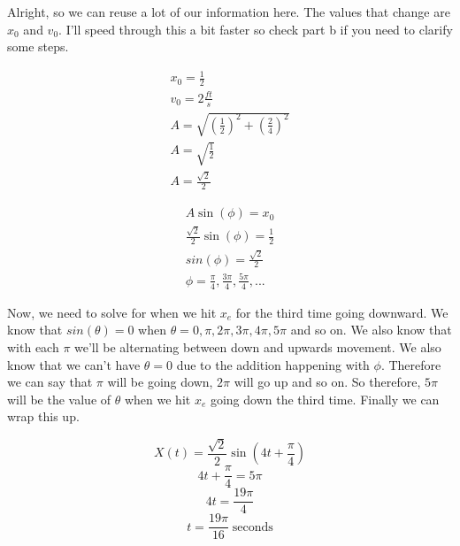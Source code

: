 \documentclass[10pt,letterpaper]{amspset}
\begin{document}
\begin{solution}
    Alright, so we can reuse a lot of our information here. The values that change are $x_0$ and $v_0$. I'll speed through this a bit faster so check part b if you need to clarify some steps.
    
    
    \begin{align}
        x_0 = \frac{1}{2} \\
        v_0 = 2 \frac{ft}{s} \\
        A = \sqrt{\left( \frac{1}{2} \right)^2 + \left( \frac{2}{4} \right)^2 } \\
        A = \sqrt{\frac{1}{2}} \\
        A = \frac{\sqrt{2}}{2}
    \end{align}
    
    \begin{align}
        A \sin(\phi) = x_0 \\ 
        \frac{\sqrt{2}}{2} \sin(\phi) = \frac{1}{2} \\
        sin(\phi) = \frac{\sqrt{2}}{2} \\
        \phi = \frac{\pi}{4}, \frac{3\pi}{4}, \frac{5\pi}{4}, ...
    \end{align}
    
    Now, we need to solve for when we hit $x_e$ for the third time going downward. We know that $sin(\theta) = 0$ when $\theta = 0, \pi, 2\pi, 3\pi, 4\pi, 5\pi$ and so on. We also know that with each $\pi$ we'll be alternating between down and upwards movement. We also know that we can't have $\theta = 0$ due to the addition happening with $\phi$. Therefore we can say that $\pi$ will be going down, $2\pi$ will go up and so on. So therefore, $5\pi$ will be the value of $\theta$ when we hit $x_e$ going down the third time. Finally we can wrap this up.
    
    \[X(t) = \frac{\sqrt{2}}{2} \sin \left( 4t + \frac{\pi}{4} \right) \]
    \[4t + \frac{\pi}{4} = 5\pi\]
    \[4t = \frac{19\pi}{4}\]
    \[\boxed{t = \frac{19\pi}{16} \; \text{seconds}}\]
\end{solution}
\end{document}
